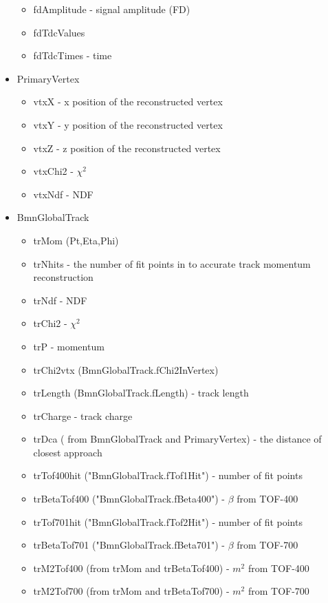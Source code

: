 \begin{itemize}
\begin{itemize}
            \item fdAmplitude - signal amplitude (FD)
            \item fdTdcValues
            \item fdTdcTimes - time
        \end{itemize}
    \item PrimaryVertex
        \begin{itemize}
            \item vtxX - x position of the reconstructed vertex 
            \item vtxY - y position of the reconstructed vertex
            \item vtxZ - z position of the reconstructed vertex
            \item vtxChi2 - $\chi^{2}$ 
            \item vtxNdf - NDF
        \end{itemize}
    \item BmnGlobalTrack
        \begin{itemize}
            \item trMom (Pt,Eta,Phi)
            \item trNhits - the number of fit points in to accurate track momentum reconstruction
            \item trNdf - NDF
            \item trChi2 - $\chi^{2}$
            \item trP - momentum
            \item trChi2vtx (BmnGlobalTrack.fChi2InVertex)
            \item trLength (BmnGlobalTrack.fLength) - track length
            \item trCharge - track charge
            \item trDca ( from BmnGlobalTrack and PrimaryVertex) - the distance of closest approach         
            \item trTof400hit ("BmnGlobalTrack.fTof1Hit") - number of fit points
            \item trBetaTof400 ("BmnGlobalTrack.fBeta400") - $\beta$ from TOF-400
            \item trTof701hit ("BmnGlobalTrack.fTof2Hit") - number of fit points
            \item trBetaTof701 ("BmnGlobalTrack.fBeta701") - $\beta$ from TOF-700
            \item trM2Tof400 (from trMom and trBetaTof400) - $m^2$ from TOF-400
            \item trM2Tof700 (from trMom and trBetaTof700) - $m^2$ from TOF-700

\end{itemize}
\end{itemize}
